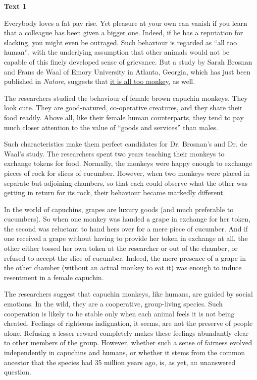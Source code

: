 
\begin{center}\textbf{Text 1}\end{center}

\qquad Everybody loves a fat pay rise. Yet pleasure at your own can vanish if you learn that a colleague has been given a bigger one. Indeed, if he has a reputation for slacking, you might even be outraged. Such behaviour is regarded as ``all too human'', with the underlying assumption that other animals would not be capable of this finely developed sense of grievance. But a study by Sarah Brosnan and Frans de Waal of Emory University in Atlanta, Georgia, which has just been published in \emph{Nature}, suggests that \ul{it is all too monkey}, as well.

\qquad The researchers studied the behaviour of female brown capuchin monkeys. They look cute. They are good-natured, co-operative creatures, and they share their food readily. Above all, like their female human counterparts, they tend to pay much closer attention to the value of ``goods and services'' than males.

\qquad Such characteristics make them perfect candidates for Dr. Brosnan's and Dr. de Waal's study. The researchers spent two years teaching their monkeys to exchange tokens for food. Normally, the monkeys were happy enough to exchange pieces of rock for slices of cucumber. However, when two monkeys were placed in separate but adjoining chambers, so that each could observe what the other was getting in return for its rock, their behaviour became markedly different.

\qquad In the world of capuchins, grapes are luxury goods (and much preferable to cucumbers). So when one monkey was handed a grape in exchange for her token, the second was reluctant to hand hers over for a mere piece of cucumber. And if one received a grape without having to provide her token in exchange at all, the other either tossed her own token at the researcher or out of the chamber, or refused to accept the slice of cucumber. Indeed, the mere presence of a grape in the other chamber (without an actual monkey to eat it) was enough to induce resentment in a female capuchin.

\qquad The researchers suggest that capuchin monkeys, like humans, are guided by social emotions. In the wild, they are a cooperative, group-living species. Such cooperation is likely to be stable only when each animal feels it is not being cheated. Feelings of righteous indignation, it seems, are not the preserve of people alone. Refusing a lesser reward completely makes these feelings abundantly clear to other members of the group. However, whether such a sense of fairness evolved independently in capuchins and humans, or whether it stems from the common ancestor that the species had 35 million years ago, is, as yet, an unanswered question.

